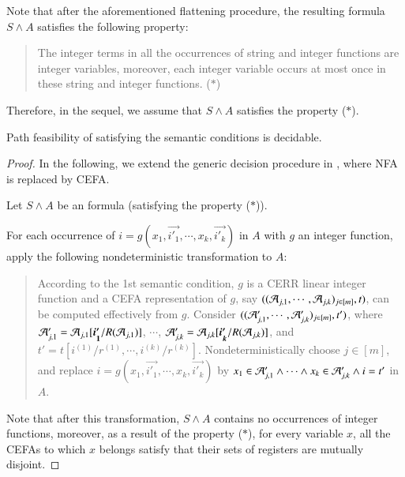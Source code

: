 \documentclass{llncs}
\begin{document}
Note that after the aforementioned flattening procedure, the resulting formula $S \wedge A$ satisfies the following property: 
\begin{quote}
The integer terms in all the occurrences of string and integer functions  are integer variables, moreover, each integer variable occurs at most once in these string and integer functions.  \hfill ($*$)
\end{quote}
Therefore, in the sequel, we assume that $S \wedge A$ satisfies the property ($*$).

\begin{theorem}\label{thm-sl-int-dec}
Path feasibility of {\slint} satisfying the semantic conditions is decidable.
\end{theorem}

\begin{proof}
In the following, we extend the generic decision procedure in \cite{CHL+18}, where NFA is replaced by CEFA.

Let $S \wedge A$ be an {\slint} formula (satisfying the property ($*$)).

For each occurrence of $i = g(x_1, \vec{i'_1}, \cdots, x_k, \vec{i'_k})$ in $A$ with $g$ an integer function, apply the following nondeterministic transformation to $A$: 
\begin{quote}
According to the 1st semantic condition, $g$ is a CERR linear integer function and a CEFA representation of $g$, say $((\mathcal{A}_{j,1}, \cdots, \mathcal{A}_{j, k})_{j \in [m]}, t)$, can be computed effectively from $g$. Consider $((\mathcal{A}'_{j,1}, \cdots, \mathcal{A}'_{j, k})_{j \in [m]}, t')$, where $\Aut'_{j,1}=\Aut_{j,1}[\vec{i'_1}/R(\Aut_{j,1})]$, $\cdots$, $\Aut'_{j,k}=\Aut_{j,k}[\vec{i'_k}/R(\Aut_{j,k})]$, and $t' = t[i^{(1)}/r^{(1)}, \cdots, i^{(k)}/r^{(k)}]$.
Nondeterministically choose $j \in [m]$, and replace $i = g(x_1, \vec{i'_1}, \cdots, x_k, \vec{i'_k})$ by $x_1 \in \mathcal{A}'_{j,1} \wedge \cdots \wedge x_k \in \mathcal{A}'_{j,k} \wedge i = t'$ in $A$.
\end{quote}
Note that after this transformation, $S \wedge A$ contains no occurrences of integer functions, moreover, as a result of the property ($*$), for every variable $x$, all the CEFAs to which $x$ belongs satisfy that their sets of registers are  mutually disjoint.


\end{proof}
\end{document}
